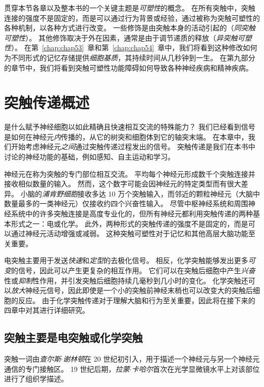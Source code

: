 贯穿本节各章以及整本书的一个关键主题是\textit{可塑性}的概念。
在所有突触中，突触连接的强度不是固定的，而是可以通过行为背景或经验，通过被称为突触可塑性的各种机制，以各种方式进行改变。
一些修饰是由突触本身的活动引起的（\textit{同突触可塑性}）。
其他修饰取决于外在因素，通常是由于调节递质的释放（\textit{异突触可塑性}）。
在第~\ref{chap:chap53}~章和第~\ref{chap:chap54}~章中，我们将看到这种修改如何为不同形式的记忆存储提供\textit{细胞基质}，其持续时间从几秒钟到一生。
在第九部分的章节中，我们将看到突触可塑性功能障碍如何导致各种神经疾病和精神疾病。



\chapter{突触传递概述} \label{chap:chap11}

是什么赋予神经细胞以如此精确且快速相互交流的特殊能力？
我们已经看到信号是如何在神经元\textit{内}传播的，从它的树突和细胞体到它的轴突末端。
在本章中，我们开始考虑神经元\textit{之间}通过突触传递过程发出的信号。
突触传递是我们在本书中讨论的神经功能的基础，例如感知、自主运动和学习。


神经元在称为突触的专门部位相互交流。
平均每个神经元形成数千个突触连接并接收相似数量的输入。
然而，这个数字可能会因神经元的特定类型而有很大差异。
小脑的\textit{浦肯野细胞}接收多达 10 万个突触输入，而邻近的颗粒神经元（大脑中数量最多的一类神经元）仅接收约四个兴奋性输入。
尽管中枢神经系统和周围神经系统中的许多突触连接是高度专业化的，但所有神经元都利用突触传递的两种基本形式之一：电或化学。
此外，两种形式的突触传递的强度不是固定的，而是可以通过神经元活动增强或减弱。
这种突触可塑性对于记忆和其他高层大脑功能至关重要。


电突触主要用于发送\textit{快速}和\textit{定型}的去极化信号。
相反，化学突触能够发出更多\textit{可变}的信号，因此可以产生更复杂的相互作用。
它们可以在突触后细胞中产生\textit{兴奋}性或\textit{抑制}性作用，并引发突触后细胞持续几毫秒到几小时的变化。
化学突触还可以\textit{放大}神经元信号，因此即使是一个小的突触前神经末梢也可以改变大的突触后细胞的反应。
由于化学突触传递对于理解大脑和行为至关重要，因此将在接下来的四章中对其进行详细研究。



\section{突触主要是电突触或化学突触}

突触一词由\textit{查尔斯$\cdot$谢林顿}在 20 世纪初引入，用于描述一个神经元与另一个神经元通信的专门接触区。
19 世纪后期，\textit{拉蒙$\cdot$卡哈尔}首次在光学显微镜水平上对该部位进行了组织学描述。


